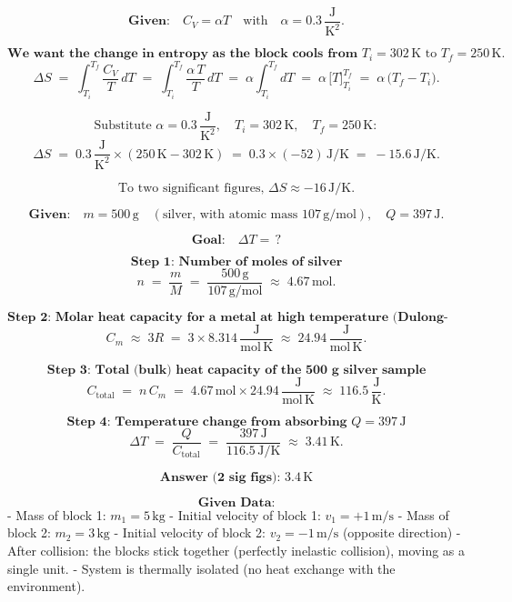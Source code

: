 \documentclass[12pt]{article}
\title{}
\author{Jerich Lee}
\date{\today}
\theoremstyle{definition} %
\theoremstyle{plain} %
\begin{document}
\maketitle
\[
\textbf{Given:} \quad C_V = \alpha T \quad\text{with}\quad \alpha = 0.3\,\frac{\text{J}}{\text{K}^2}.
\]

\[
\textbf{We want the change in entropy as the block cools from } T_i = 302\,\text{K} \text{ to } T_f = 250\,\text{K.}
\]
\[
\Delta S \;=\; \int_{T_i}^{T_f} \frac{C_V}{T}\, dT
\;=\; \int_{T_i}^{T_f} \frac{\alpha\,T}{T}\, dT
\;=\; \alpha \int_{T_i}^{T_f} dT
\;=\; \alpha \,\bigl[T\bigr]_{T_i}^{T_f}
\;=\; \alpha\,\bigl(T_f - T_i\bigr).
\]

\[
\text{Substitute } \alpha = 0.3\,\frac{\text{J}}{\text{K}^2}, \quad
T_i = 302\,\text{K}, \quad
T_f = 250\,\text{K}:
\]
\[
\Delta S
\;=\; 0.3\,\frac{\text{J}}{\text{K}^2}\times (250\,\text{K} - 302\,\text{K})
\;=\; 0.3 \times (-52)\,\text{J/K}
\;=\; -15.6\,\text{J/K}.
\]

\[
\text{To two significant figures, } \Delta S \approx \boxed{-16\,\text{J/K}}.
\]

\[
\textbf{Given:}
\quad m = 500\,\mathrm{g}
\quad (\text{silver, with atomic mass }107\,\mathrm{g/mol}),
\quad Q = 397\,\mathrm{J}.
\]

\[
\textbf{Goal:}
\quad \Delta T = \,?
\]

\[
\textbf{Step 1: Number of moles of silver}
\]
\[
n \;=\; \frac{m}{M}
\;=\;
\frac{500\,\mathrm{g}}{107\,\mathrm{g/mol}}
\;\approx\;4.67\,\mathrm{mol}.
\]

\[
\textbf{Step 2: Molar heat capacity for a metal at high temperature (Dulong-Petit)}
\]
\[
C_m \;\approx\; 3R 
\;=\;3 \times 8.314\,\frac{\mathrm{J}}{\mathrm{mol\,K}}
\;\approx\;24.94\,\frac{\mathrm{J}}{\mathrm{mol\,K}}.
\]

\[
\textbf{Step 3: Total (bulk) heat capacity of the 500 g silver sample}
\]
\[
C_{\text{total}}
\;=\;
n\,C_m
\;=\;
4.67\,\mathrm{mol}\times 24.94\,\frac{\mathrm{J}}{\mathrm{mol\,K}}
\;\approx\;116.5\,\frac{\mathrm{J}}{\mathrm{K}}.
\]

\[
\textbf{Step 4: Temperature change from absorbing } Q=397\,\mathrm{J}
\]
\[
\Delta T
\;=\;\frac{Q}{C_{\text{total}}}
\;=\;\frac{397\,\mathrm{J}}{116.5\,\mathrm{J/K}}
\;\approx\;3.41\,\mathrm{K}.
\]

\[
\textbf{Answer (2 sig figs): }\boxed{3.4\,\mathrm{K}}
\] 

\[
\textbf{Given Data:}
\]
- Mass of block 1: \(m_1 = 5\,\text{kg}\)
- Initial velocity of block 1: \(v_1 = +1\,\text{m/s}\)
- Mass of block 2: \(m_2 = 3\,\text{kg}\)
- Initial velocity of block 2: \(v_2 = -1\,\text{m/s}\)  (opposite direction)
- After collision: the blocks stick together (perfectly inelastic collision), moving as a single unit.
- System is thermally isolated (no heat exchange with the environment).
\end{document}
